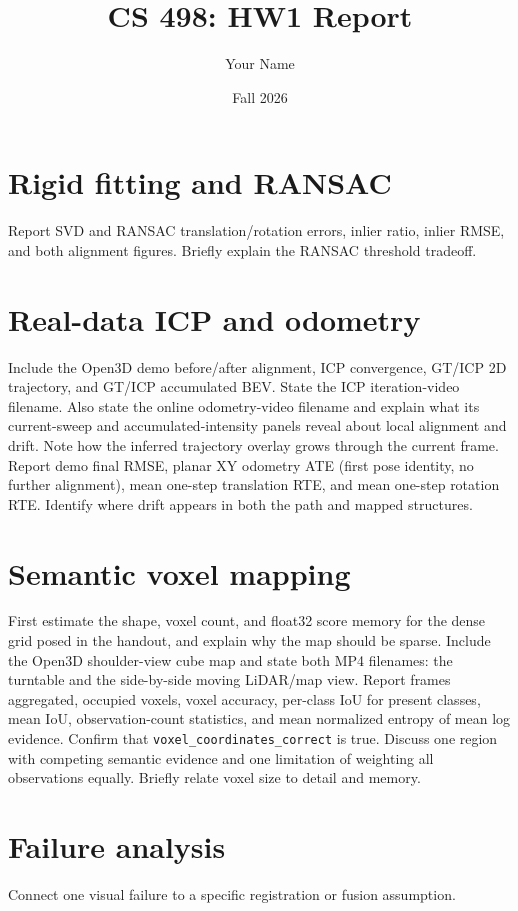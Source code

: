 \documentclass[11pt]{article}
\title{CS 498: HW1 Report}
\author{Your Name}
\date{Fall 2026}
\begin{document}
\maketitle

\section{Rigid fitting and RANSAC}
Report SVD and RANSAC translation/rotation errors, inlier ratio, inlier RMSE,
and both alignment figures. Briefly explain the RANSAC threshold tradeoff.

\section{Real-data ICP and odometry}
Include the Open3D demo before/after alignment, ICP convergence, GT/ICP 2D
trajectory, and GT/ICP accumulated BEV. State the ICP iteration-video filename.
Also state the online odometry-video filename and explain what its current-sweep
and accumulated-intensity panels reveal about local alignment and drift. Note
how the inferred trajectory overlay grows through the current frame.
Report demo final RMSE, planar XY odometry ATE (first pose identity, no further
alignment), mean one-step translation RTE, and mean
one-step rotation RTE. Identify where drift appears in both the path and mapped
structures.

\section{Semantic voxel mapping}
First estimate the shape, voxel count, and float32 score memory for the dense
grid posed in the handout, and explain why the map should be sparse.
Include the Open3D shoulder-view cube map and state both MP4 filenames: the
turntable and the side-by-side moving LiDAR/map view. Report frames aggregated,
occupied voxels, voxel accuracy, per-class IoU for present classes, mean IoU,
observation-count statistics, and mean normalized entropy of mean log evidence.
Confirm that \texttt{voxel\_coordinates\_correct} is true. Discuss one region
with competing semantic evidence and one limitation of weighting all
observations equally. Briefly relate voxel size to detail and memory.

\section{Failure analysis}
Connect one visual failure to a specific registration or fusion assumption.
\end{document}
